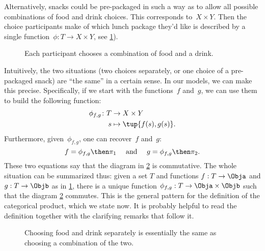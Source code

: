 Alternatively, snacks could be pre-packaged in such a way as to allow all possible combinations of food and drink choices. This corresponds to~$X\times Y$.
Then the choice participants make of which lunch package they'd like is described by a single function~$\phi\colon T\to X\times Y$, see \cref{fig:snacks_2}).

\begin{figure}[h!]
  \begin{center}
  \end{center}
  \caption{Each participant chooses a combination of food and a drink. \label{fig:snacks_2}}
\end{figure}

Intuitively, the two situations (two choices separately, or one choice of a pre-packaged snack) are ``the same'' in a certain sense.
In our models, we can make this precise.
Specifically, if we start with the functions~$f$ and~$g$, we can use them to build the following function:
\begin{equation*}
  \begin{aligned}
    \phi_{f,g}\colon T&\to X\times Y\\
    s&\mapsto \tup{f(s),g(s)}.
  \end{aligned}
\end{equation*}
Furthermore, given~$\phi_{f,g}$, one can recover~$f$ and~$g$:
\begin{equation*}
  f=\phi_{f,g}\then \pi_1 \quad  \text{ and } \quad g=\phi_{f,g}\then \pi_2.
\end{equation*}
These two equations say that the diagram in \cref{fig:snacks_3} is commutative.
The whole situation can be summarized thus: given a set $T$ and functions $f: T \rightarrow \Obja$ and $g: T \rightarrow \Objb$ as in \cref{fig:snacks_2}, there is a unique function $\phi_{f,g} : T \rightarrow \Obja \times \Objb$ such that the diagram \cref{fig:snacks_3} commutes.
This is the general pattern for the definition of the categorical product, which we state now.
It is probably helpful to read the definition together with the clarifying remarks that follow it.

\begin{figure}[h!]
  \begin{center}
  \end{center}
  \caption{Choosing food and drink separately is essentially the same as choosing a combination of the two. \label{fig:snacks_3}}
\end{figure}






